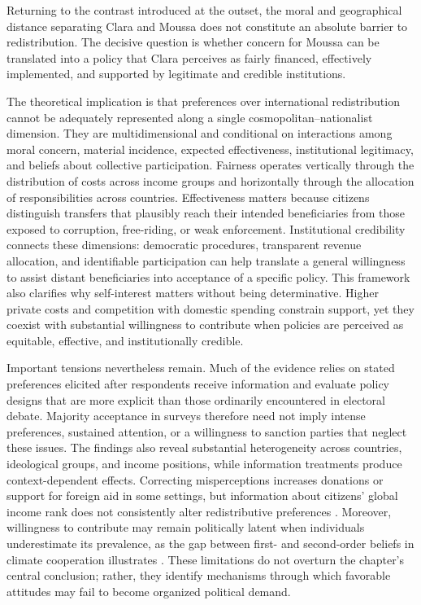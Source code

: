 Returning to the contrast introduced at the outset, the moral and geographical distance separating Clara and Moussa does not constitute an absolute barrier to redistribution. The decisive question is whether concern for Moussa can be translated into a policy that Clara perceives as fairly financed, effectively implemented, and supported by legitimate and credible institutions.

The theoretical implication is that preferences over international redistribution cannot be adequately represented along a single cosmopolitan--nationalist dimension. They are multidimensional and conditional on interactions among moral concern, material incidence, expected effectiveness, institutional legitimacy, and beliefs about collective participation. Fairness operates vertically through the distribution of costs across income groups and horizontally through the allocation of responsibilities across countries. Effectiveness matters because citizens distinguish transfers that plausibly reach their intended beneficiaries from those exposed to corruption, free-riding, or weak enforcement. Institutional credibility connects these dimensions: democratic procedures, transparent revenue allocation, and identifiable participation can help translate a general willingness to assist distant beneficiaries into acceptance of a specific policy. This framework also clarifies why self-interest matters without being determinative. Higher private costs and competition with domestic spending constrain support, yet they coexist with substantial willingness to contribute when policies are perceived as equitable, effective, and institutionally credible.

Important tensions nevertheless remain. Much of the evidence relies on stated preferences elicited after respondents receive information and evaluate policy designs that are more explicit than those ordinarily encountered in electoral debate. Majority acceptance in surveys therefore need not imply intense preferences, sustained attention, or a willingness to sanction parties that neglect these issues. The findings also reveal substantial heterogeneity across countries, ideological groups, and income positions, while information treatments produce context-dependent effects. Correcting misperceptions increases donations or support for foreign aid in some settings, but information about citizens' global income rank does not consistently alter redistributive preferences \citep{nair_misperceptions_2018,fehr_your_2019}. Moreover, willingness to contribute may remain politically latent when individuals underestimate its prevalence, as the gap between first- and second-order beliefs in climate cooperation illustrates \citep{andre_globally_2024,mildenberger_beliefs_2017}. These limitations do not overturn the chapter's central conclusion; rather, they identify mechanisms through which favorable attitudes may fail to become organized political demand.

